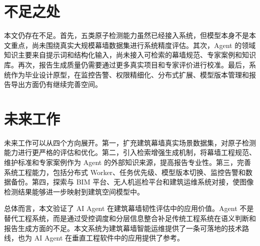 \section{不足之处}
\label{sec:conclusion-limitations}

本文仍存在不足。首先，五类原子检测能力虽然已经接入系统，但模型本身不是本文重点，尚未围绕真实大规模幕墙数据集进行系统精度评估。其次，Agent 的领域知识主要来自提示词和结构化输入，尚未接入可检索的幕墙规范、专家案例和知识库。再次，报告生成质量仍需要通过更多真实项目和专家评价进行校准。最后，系统作为毕业设计原型，在监控告警、权限精细化、分布式扩展、模型版本管理和报告导出方面仍有继续完善空间。

\section{未来工作}
\label{sec:conclusion-future}

未来工作可以从四个方向展开。第一，扩充建筑幕墙真实场景数据集，对原子检测能力进行更严格的评估和优化。第二，引入检索增强生成机制，将幕墙工程规范、维护标准和专家案例作为 Agent 的外部知识来源，提高报告专业性。第三，完善系统工程能力，包括分布式 Worker、任务优先级、模型版本切换、监控告警和数据备份。第四，探索与 BIM 平台、无人机巡检平台和建筑运维系统对接，使图像检测结果能够进一步映射到建筑空间模型中。

总体而言，本文验证了 AI Agent 在建筑幕墙韧性评估中的应用价值。Agent 不是替代工程系统，而是通过受控调度和分层信息整合补足传统工程系统在语义判断和报告生成方面的不足。本文系统为建筑幕墙智能运维提供了一条可落地的技术路线，也为 AI Agent 在垂直工程软件中的应用提供了参考。
